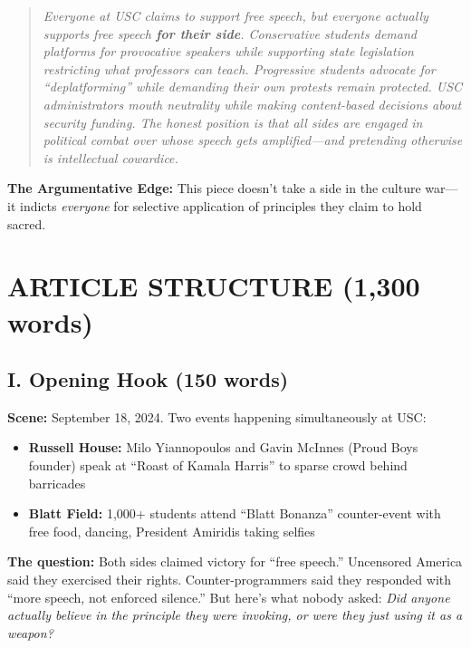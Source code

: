 \documentclass[11pt,letterpaper]{article}
\begin{document}
\begin{quote}
\textit{Everyone at USC claims to support free speech, but everyone actually supports free speech \textbf{for their side}. Conservative students demand platforms for provocative speakers while supporting state legislation restricting what professors can teach. Progressive students advocate for ``deplatforming'' while demanding their own protests remain protected. USC administrators mouth neutrality while making content-based decisions about security funding. The honest position is that all sides are engaged in political combat over whose speech gets amplified---and pretending otherwise is intellectual cowardice.}
\end{quote}

\textbf{The Argumentative Edge:} This piece doesn't take a side in the culture war---it indicts \textit{everyone} for selective application of principles they claim to hold sacred.

\section{ARTICLE STRUCTURE (1,300 words)}

\subsection{I. Opening Hook (150 words)}

\textbf{Scene:} September 18, 2024. Two events happening simultaneously at USC:
\begin{itemize}[noitemsep]
    \item \textbf{Russell House:} Milo Yiannopoulos and Gavin McInnes (Proud Boys founder) speak at ``Roast of Kamala Harris'' to sparse crowd behind barricades
    \item \textbf{Blatt Field:} 1,000+ students attend ``Blatt Bonanza'' counter-event with free food, dancing, President Amiridis taking selfies
\end{itemize}

\textbf{The question:} Both sides claimed victory for ``free speech.'' Uncensored America said they exercised their rights. Counter-programmers said they responded with ``more speech, not enforced silence.'' But here's what nobody asked: \textit{Did anyone actually believe in the principle they were invoking, or were they just using it as a weapon?}
\end{document}
